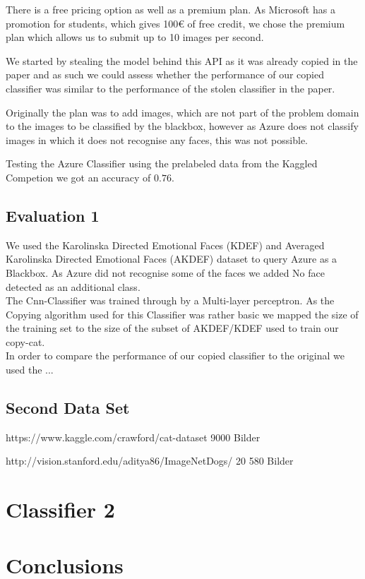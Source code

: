 \documentclass[a4paper,11pt]{article}
\begin{document}
        There is a free pricing option as well as a premium plan. As Microsoft has a promotion for students, which gives 100€ of free credit, we chose the premium plan which allows us to submit up to 10 images per second.
        
        We started by stealing the model behind this API as it was already copied in the paper and as such we could assess whether the performance of our copied classifier was similar to the performance of the stolen classifier in the paper.
        
        Originally the plan was to add images, which are not part of the problem domain to the images to be classified by the blackbox, however as Azure does not classify images in which it does not recognise any faces, this was not possible.
        
        Testing the Azure Classifier using the prelabeled data from the Kaggled Competion we got an accuracy of $0.76$.
        
    \subsection{Evaluation 1}
        We used the Karolinska Directed Emotional Faces (KDEF) and Averaged Karolinska Directed Emotional Faces (AKDEF) dataset to query Azure as a Blackbox. As Azure did not recognise some of the faces we added No face detected as an additional class. \\
        
        The Cnn-Classifier was trained through by a Multi-layer perceptron. As the Copying algorithm used for this Classifier was rather basic we mapped the size of the training set to the size of the subset of AKDEF/KDEF used to train our copy-cat.\\
        
        In order to compare the performance of our copied classifier to the original we used the ...
        


    \subsection{Second Data Set}
        https://www.kaggle.com/crawford/cat-dataset 9000 Bilder 
        
        http://vision.stanford.edu/aditya86/ImageNetDogs/ 20 580 Bilder
        
        
    
\section{Classifier 2}


\section{Conclusions}



\end{document}
